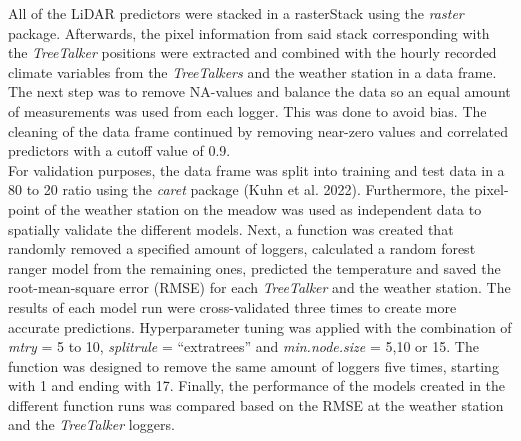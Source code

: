 \documentclass[5p]{elsarticle} %
\begin{document}
All of the LiDAR predictors were stacked in a rasterStack using the \emph{raster} package. Afterwards, the pixel information from said stack corresponding with the \emph{TreeTalker} positions were extracted and combined with the hourly recorded climate variables from the \emph{TreeTalkers} and the weather station in a data frame. The next step was to remove NA-values and balance the data so an equal amount of measurements was used from each logger. This was done to avoid bias. The cleaning of the data frame continued by removing near-zero values and correlated predictors with a cutoff value of 0.9.\\ 
For validation purposes, the data frame was split into training and test data in a 80 to 20 ratio using the \emph{caret} package (Kuhn et al. 2022). Furthermore, the pixel-point of the weather station on the meadow was used as independent data to spatially validate the different models. Next, a function was created that randomly removed a specified amount of loggers, calculated a random forest ranger model from the remaining ones, predicted the temperature and saved the root-mean-square error (RMSE) for each \emph{TreeTalker} and the weather station. The results of each model run were cross-validated three times to create more accurate predictions. Hyperparameter tuning was applied with the combination of \emph{mtry} = 5 to 10, \emph{splitrule} = “extratrees” and \emph{min.node.size} = 5,10 or 15. The function was designed to remove the same amount of loggers five times, starting with 1 and ending with 17. Finally, the performance of the models created in the different function runs was compared based on the RMSE at the weather station and the \emph{TreeTalker} loggers.
\end{document}
